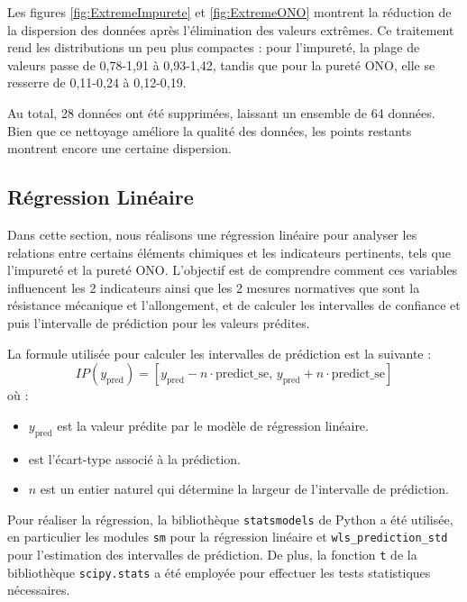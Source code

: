 \documentclass[12pt]{article}
\begin{document}
Les figures \ref{fig:ExtremeImpurete} et \ref{fig:ExtremeONO} 
montrent la réduction de la dispersion des données après 
l'élimination des valeurs extrêmes. Ce traitement rend les distributions 
un peu plus compactes : pour l'impureté, la plage de valeurs passe 
de 0,78-1,91 à 0,93-1,42, tandis que pour la pureté ONO, elle se 
resserre de 0,11-0,24 à 0,12-0,19.

Au total, 28 données ont été supprimées, laissant un ensemble de 
64 données. Bien que ce nettoyage améliore la qualité des données, les 
points restants montrent encore une certaine dispersion. 






\subsection{Régression Linéaire}



Dans cette section, nous réalisons une régression linéaire pour analyser 
les relations entre certains éléments chimiques et les indicateurs 
pertinents, tels que l'impureté et la pureté ONO. L'objectif est de 
comprendre comment ces variables influencent les 2 indicateurs ainsi que 
les 2 mesures normatives que sont la résistance mécanique et l'allongement, 
et de calculer les intervalles  de confiance et puis l'intervalle 
de prédiction pour les valeurs prédites.

\medskip %

La formule utilisée pour calculer les intervalles de prédiction est la suivante :
$$
IP (y_{\text{pred}}) = [y_{\text{pred}} - n \cdot \text{predict\_se}, \, y_{\text{pred}} + n \cdot \text{predict\_se}]
$$
où :
\begin{itemize}
    \item $y_{\text{pred}}$ est la valeur prédite par le modèle de 
    régression linéaire.
    \item {} est l'écart-type associé à la prédiction.
    \item $n$ est un entier naturel qui détermine la largeur de 
    l'intervalle de prédiction.
\end{itemize}


Pour réaliser la régression, la bibliothèque \texttt{statsmodels} de 
Python a été utilisée, en particulier les modules \texttt{sm} pour la 
régression linéaire et \texttt{wls\_prediction\_std} pour l'estimation des 
intervalles de prédiction. De plus, la fonction \texttt{t} de la 
bibliothèque \texttt{scipy.stats} a été employée pour effectuer les 
tests statistiques nécessaires.
\end{document}
